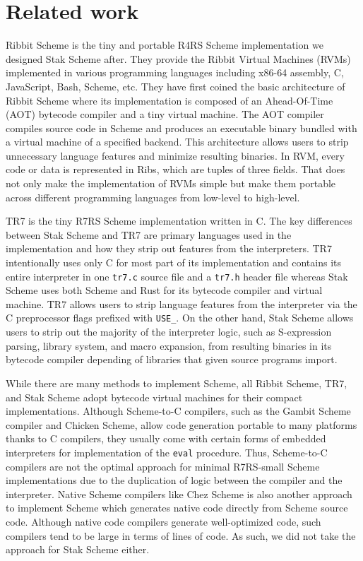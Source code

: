 \documentclass[sigplan]{acmart}
\begin{document}
\section{Related work}

Ribbit Scheme \cite{ribbit2023} is the tiny and portable R4RS Scheme
implementation we designed Stak Scheme after. They provide
the Ribbit Virtual Machines (RVMs) implemented in various
programming languages
including x86-64 assembly, C, JavaScript, Bash, Scheme, etc.
They have first coined the basic architecture of Ribbit Scheme
\cite{ribbit2021} where its implementation is composed of an
Ahead-Of-Time (AOT) bytecode compiler and a tiny virtual machine.
The AOT compiler compiles source code in Scheme and produces
an executable binary bundled with a virtual machine of a specified backend.
This architecture allows users to strip unnecessary language
features and minimize resulting binaries.
In RVM, every code or data is represented in
Ribs, which are tuples of three fields.
That does not only make the implementation of
RVMs simple but make them portable across different
programming languages from low-level to high-level.

TR7 \cite{tr7} is the tiny R7RS Scheme implementation written in C.
The key differences between Stak Scheme and TR7 are primary languages used in
the implementation and how they strip out features from the
interpreters.
TR7 intentionally uses only C for most part of its implementation and
contains its entire interpreter in one \texttt{tr7.c} source file and a
\texttt{tr7.h} header file whereas Stak Scheme uses both Scheme and
Rust for its bytecode compiler and virtual machine.
TR7 allows users to strip language features from the interpreter via
the C preprocessor flags prefixed with \texttt{USE\_}.
On the other hand, Stak Scheme allows users to strip out the majority of
the interpreter logic, such as S-expression parsing, library system, and
macro expansion, from resulting binaries in its bytecode compiler
depending of libraries that given source programs import.

While there are many methods to implement Scheme, all Ribbit Scheme,
TR7, and Stak Scheme adopt bytecode virtual machines for their
compact implementations.
Although Scheme-to-C compilers, such as the Gambit Scheme compiler and
Chicken Scheme, allow code generation portable to many platforms
thanks to C compilers, they usually come with certain forms of embedded
interpreters for implementation of the \texttt{eval} procedure.
Thus, Scheme-to-C compilers are not the optimal approach for minimal
R7RS-small Scheme implementations due to the duplication of logic between the
compiler and the interpreter.
Native Scheme compilers like Chez Scheme is also another approach to
implement Scheme which generates native code directly from Scheme source code.
Although native code compilers generate well-optimized code, such
compilers tend to be large in terms of lines of code.
As such, we did not take the approach for Stak Scheme either.
\end{document}
